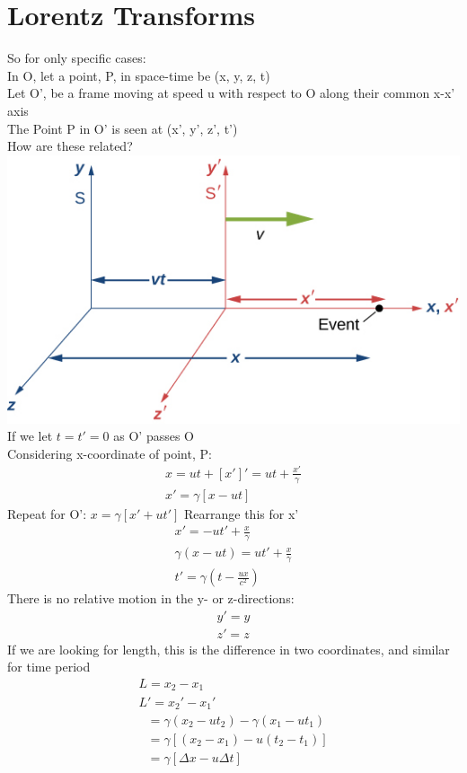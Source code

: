 \documentclass[a4paper, 11pt, fleqn, normalem]{report}
\begin{document}
\section{Lorentz Transforms}
So for only specific cases: \\
In O, let a point, P, in space-time be (x, y, z, t) \\
Let O', be a frame moving at speed u with respect to O along their common x-x' axis \\
The Point P in O' is seen at (x', y', z', t') \\
How are these related? \\
\includegraphics{Axes.jpg} \\
If we let $t = t' = 0$ as O' passes O \\
Considering x-coordinate of point, P:
\begin{gather*}
    x = ut + [x']' = ut + \frac{x'}{\gamma} \\
    x' = \gamma [x - ut]
\end{gather*}
Repeat for O': $x = \gamma [x' + ut']$
Rearrange this for x'
\begin{gather*}
    x' = -ut' + \frac{x}{\gamma} \\
    \gamma(x - ut) = ut' + \frac{x}{\gamma} \\
    t' = \gamma(t - \frac{ux}{c^{2}})
\end{gather*}
There is no relative motion in the y- or z-directions:
\begin{gather*}
    y' = y \\
    z' = z
\end{gather*}
If we are looking for length, this is the difference in two coordinates, and similar for time period
\begin{gather*}
    L = x_{2} - x_{1} \\
    L' = x_{2}' - x_{1}' \\
    ~~~ = \gamma(x_{2} - ut_{2}) - \gamma(x_{1} - ut_{1}) \\
    ~~~ = \gamma[(x_{2} - x_{1}) - u(t_{2} - t_{1})] \\
    ~~~ = \gamma[\Delta x - u\Delta t]
\end{gather*}
\end{document}
